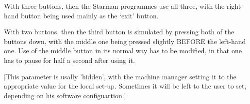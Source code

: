 {{{  With three buttons, then the Starman programmes use all three, with
  the right-hand button being used mainly as the `exit' button. 

  With two buttons, then the third button is simulated by pressing 
  both of the buttons down, with the middle one being pressed slightly 
  BEFORE the left-hand one. Use of the middle button in its normal
  way has to be modified, in that one has to pause for half a second
  after using it.

  [This parameter is usally 'hidden', with the machine manager setting
   it to the appropriate value for the local set-up. Sometimes it will 
   be left to the user to set, depending on his software configuartion.]

}}}
